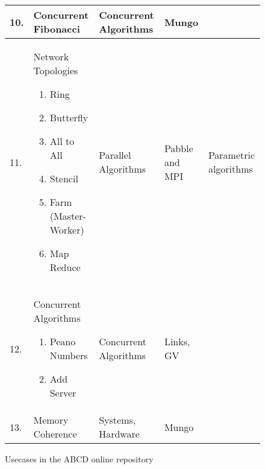 \begin{figure}
\begin{longtable}{|  l | p{3.2cm} | p{3cm} | p{2.5cm} | p{2.7cm} | }
		\hline
		10.	&	Concurrent Fibonacci
						&	Concurrent Algorithms		&	Mungo					&
		\\
		\hline
		11.	&	Network Topologies
				\begin{enumerate}[label=$\bullet$]
					\item	Ring
					\item	Butterfly
					\item	All to All
					\item	Stencil
					\item	Farm (Master-Worker)
					\item	Map Reduce
				\end{enumerate}
						&	Parallel Algorithms		&	Pabble and MPI				&	Parametric algorithms
		\\
		\hline
		12.	&	Concurrent Algorithms
				\begin{enumerate}[label=$\bullet$]
					\item	Peano Numbers
					\item	Add Server
				\end{enumerate}
						&	Concurrent Algorithms	&	Links, GV					&
		\\
		\hline
		13.	&	Memory Coherence
						&	Systems, Hardware		&	Mungo						&	
		\\
		\hline
	\end{longtable}
	\caption{Usecases in the ABCD online repository}
	\label{fig:usecases}
\end{figure}
